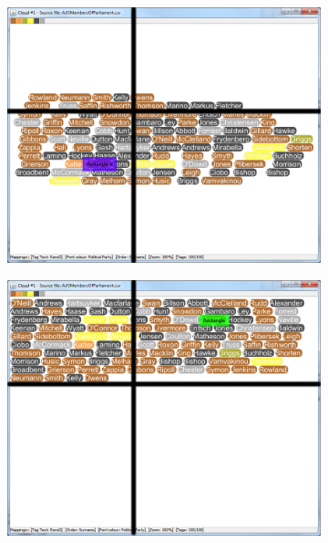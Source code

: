 \begin{figure}[!htb]
\centering
\begin{subfigure}{.5\textwidth}
  \centering
  \includegraphics[scale=0.25]{Experiment2/T1/M2Spiral.png}
\end{subfigure}%
\begin{subfigure}{.5\textwidth}
  \centering
 \includegraphics[scale=0.25]{Experiment2/T1/M2Typewriter.png}
\end{subfigure}
\begin{subfigure}{.5\textwidth}
  \centering

\end{subfigure}
\end{figure}
